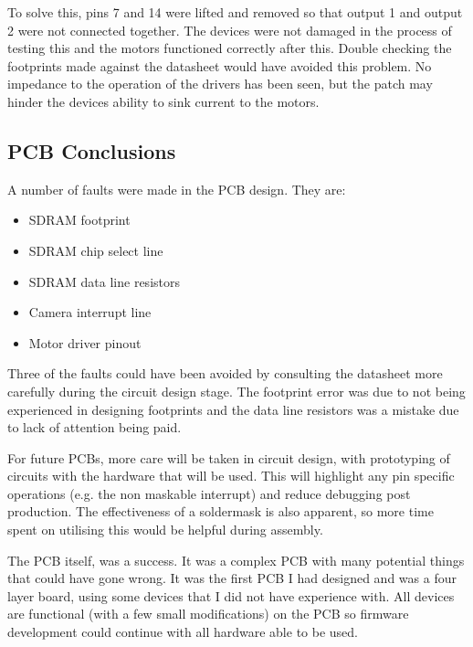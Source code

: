 To solve this, pins 7 and 14 were lifted and removed so that output 1 and output 2 were not connected together. The devices were not damaged in the process of testing this and the motors functioned correctly after this. Double checking the footprints made against the datasheet would have avoided this problem. No impedance to the operation of the drivers has been seen, but the patch may hinder the devices ability to sink current to the motors. 

\subsection{PCB Conclusions}
A number of faults were made in the PCB design. They are:
\begin{itemize}
\item SDRAM footprint
\item SDRAM chip select line
\item SDRAM data line resistors
\item Camera interrupt line
\item Motor driver pinout
\end{itemize}
Three of the faults could have been avoided by consulting the datasheet more carefully during the circuit design stage. The footprint error was due to not being experienced in designing footprints and the data line resistors was a mistake due to lack of attention being paid. 

For future PCBs, more care will be taken in circuit design, with prototyping of circuits with the hardware that will be used. This will highlight any pin specific operations (e.g. the non maskable interrupt) and reduce debugging post production. The effectiveness of a soldermask is also apparent, so more time spent on utilising this would be helpful during assembly.

The PCB itself, was a success. It was a complex PCB with many potential things that could have gone wrong. It was the first PCB I had designed and was a four layer board, using some devices that I did not have experience with. All devices are functional (with a few small modifications) on the PCB so firmware development could continue with all hardware able to be used.


